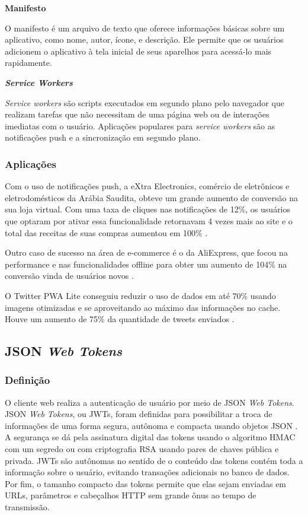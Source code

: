 \begin{description}

\item \textbf{Manifesto}

O manifesto é um arquivo de texto que oferece informações básicas sobre um aplicativo, como nome, autor, ícone, e descrição. Ele permite que os usuários adicionem o aplicativo à tela inicial de seus aparelhos para acessá-lo mais rapidamente.

\item \textbf{\textit{Service Workers}}

\textit{Service workers} são scripts executados em segundo plano pelo navegador que realizam tarefas que não necessitam de uma página web ou de interações imediatas com o usuário. Aplicações populares para \textit{service workers} são as notificações push e a sincronização em segundo plano.

\end{description}

\subsubsection{Aplicações}
Com o uso de notificações push, a eXtra Electronics, comércio de eletrônicos e eletrodomésticos da Arábia Saudita, obteve um grande aumento de conversão na sua loja virtual. Com uma taxa de cliques nas notificações de 12\%, os usuários que optaram por ativar essa funcionalidade retornavam 4 vezes mais ao site e o total das receitas de suas compras aumentou em 100\% \cite{googledevextra}.

Outro caso de sucesso na área de e-commerce é o da AliExpress, que focou na performance e nas funcionalidades offline para obter um aumento de 104\% na conversão vinda de usuários novos \cite{googledevaliexpress}.

O Twitter PWA Lite conseguiu reduzir o uso de dados em até 70\% usando imagens otimizadas e se aproveitando ao máximo das informações no cache. Houve um aumento de 75\% da quantidade de tweets enviados \cite{googledevtwitter}.

\subsection{JSON \textit{Web Tokens}}

\subsubsection{Definição}
O cliente web realiza a autenticação de usuário por meio de JSON \textit{Web Tokens}. JSON \textit{Web Tokens}, ou JWTs, foram definidas para possibilitar a troca de informações de uma forma segura, autônoma e compacta usando objetos JSON \cite{rfc7519}. A segurança se dá pela assinatura digital das tokens usando o algoritmo HMAC com um segredo ou com criptografia RSA usando pares de chaves pública e privada. JWTs são autônomas no sentido de o conteúdo das tokens contém toda a informação sobre o usuário, evitando transações adicionais no banco de dados. Por fim, o tamanho compacto das tokens permite que elas sejam enviadas em URLs, parâmetros e cabeçalhos HTTP sem grande ônus ao tempo de transmissão.

